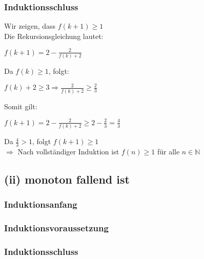 \documentclass{article}
\begin{document}
\subsubsection{Induktionsschluss}
Wir zeigen, dass $f(k+1) \geq 1$ \\
Die Rekursionsgleichung lautet:\\
\begin{center}
$f(k+1) = 2- \frac{2}{f(k)+2}$ \\
\end{center}
Da $f(k) \geq 1$, folgt: \\
\begin{center}
$f(k)+2 \geq 3 \Longrightarrow \frac{2}{f(k)+2} \geq \frac{2}{3}$ \\
\end{center}
Somit gilt: \\
\begin{center}
$f(k+1)=2-\frac{2}{f(k)+2} \geq 2-\frac{2}{3} = \frac{4}{3}$ \\
\end{center}
Da $\frac{4}{3}>1$, folgt $f(k+1) \geq 1$ \\

$\Longrightarrow$ Nach vollständiger Induktion ist $f(n) \geq 1$ für alle $n \in \mathbb{N}$


\subsection{(ii) monoton fallend ist}
\subsubsection{Induktionsanfang}

\subsubsection{Induktionsvoraussetzung}

\subsubsection{Induktionsschluss}
\end{document}

